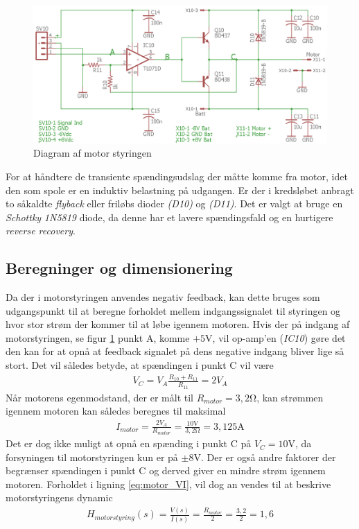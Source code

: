 \begin{figure}[h!]
	\centering
	\includegraphics[width=1\textwidth]{billeder/motor_cont_schematic.png}
	\caption{Diagram af motor styringen}
	\label{fig:motor_diagram}
\end{figure}
\FloatBlock

For at håndtere de transiente spændingsudslag der måtte komme fra motor, idet den som spole er en induktiv belastning på udgangen.
Er der i kredsløbet anbragt to såkaldte \textit{flyback} eller friløbs dioder \emph{(D10)} og \emph{(D11)}.
Det er valgt at bruge en \textit{Schottky} \emph{1N5819}\cite{1N5819} diode, da denne har et lavere spændingsfald og en hurtigere \textit{reverse recovery}.

\subsection{Beregninger og dimensionering}
Da der i motorstyringen anvendes negativ feedback, kan dette bruges som udgangspunkt til at beregne forholdet mellem indgangssignalet til styringen og hvor stor strøm der kommer til at løbe igennem motoren.
Hvis der på indgang af motorstyringen, se figur \ref{fig:motor_diagram} punkt A, komme $+5 \si{\volt}$, vil op-amp'en (\emph{IC10}) gøre det den kan for at opnå at feedback signalet på dens negative indgang bliver lige så stort.
Det vil således betyde, at spændingen i punkt C vil være
\begin{align}
V_C = V_A \frac{R_{10}+R_{11}}{R_{11}} = 2V_A
\end{align}
Når motorens egenmodstand, der er målt til $R_{motor} = 3,2 \si{\ohm}$, kan strømmen igennem motoren kan således beregnes til maksimal
\begin{align}
I_{motor} =  \frac{2V_A}{R_{motor}} = \frac{10\si{\volt}}{3,2\si{\ohm}} = 3,125\si{\ampere} \label{eq:motor_VI}
\end{align}
Det er dog ikke muligt at opnå en spænding i punkt C på $V_C = 10\si{\volt}$, da forsyningen til motorstyringen kun er på $\pm 8 \si{\volt}$.
Der er også andre faktorer der begrænser spændingen i punkt C og derved giver en mindre strøm igennem motoren.
Forholdet i ligning \ref{eq:motor_VI}, vil dog an vendes til at beskrive motorstyringens dynamic
\begin{align}
H_{motor styring}(s) = \frac{V(s)}{I(s)} =\frac{R_{motor}}{2} = \frac{3,2}{2} = 1,6 \label{eq:motor_styr_trans}
\end{align}   

